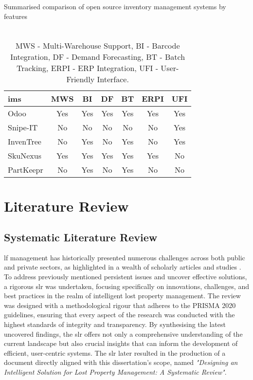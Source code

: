 \begin{table}[!htb]
\centering
\caption{Summarised comparison of open source inventory management systems by features}
\begin{tabular}{|l|c|c|c|c|c|c|}
\hline
\textbf{\ac{ims}} & \textbf{MWS} & \textbf{BI} & \textbf{DF} & \textbf{BT} & \textbf{ERPI} & \textbf{UFI} \\
\hline
Odoo & Yes & Yes & Yes & Yes & Yes & Yes \\
\hline
Snipe-IT & No  & No  & No  & No  & No  & Yes \\
\hline
InvenTree & No  & Yes & No  & Yes & No  & Yes \\
\hline
SkuNexus & Yes & Yes & Yes & Yes & Yes & No  \\
\hline
PartKeepr & No  & Yes & No  & Yes & No  & No  \\
\hline
\end{tabular}
\caption*{\\MWS - Multi-Warehouse Support, BI - Barcode Integration, DF - Demand Forecasting, BT - Batch Tracking, ERPI - ERP Integration, UFI - User-Friendly Interface.}
\label{table:ims_comparison}
\end{table}

\section{Literature Review} \label{sec:literature-review}

\subsection{Systematic Literature Review} \label{subsec:slr}


\ac{lf} management has historically presented numerous challenges across both public and private sectors, as highlighted in a wealth of scholarly articles and studies \cite{Prawira2024}. To address previously mentioned persistent issues and uncover effective solutions, a rigorous \ac{slr} was undertaken, focusing specifically on innovations, challenges, and best practices in the realm of intelligent lost property management. The review was designed with a methodological rigour that adheres to the PRISMA 2020 guidelines, ensuring that every aspect of the research was conducted with the highest standards of integrity and transparency. By synthesising the latest uncovered findings, the \ac{slr} offers not only a comprehensive understanding of the current landscape but also crucial insights that can inform the development of efficient, user-centric systems. The \ac{slr} later resulted in the production of a document directly aligned with this dissertation's scope, named \textit{"Designing an Intelligent Solution for Lost Property Management: A Systematic Review"}.


